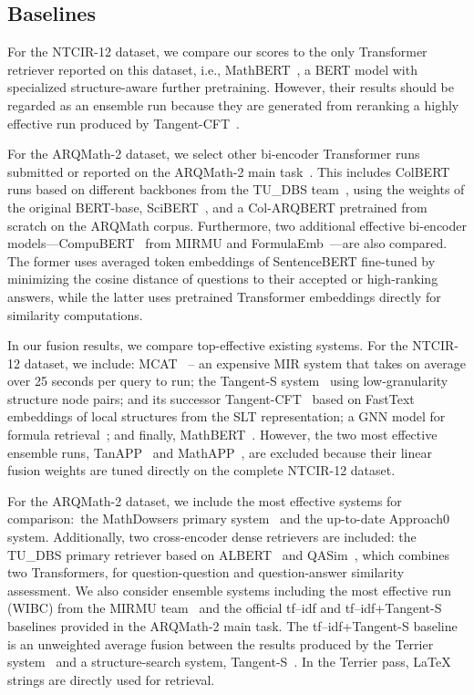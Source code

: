 \documentclass[11pt]{article}
\begin{document}
\subsection{Baselines}

For the NTCIR-12 dataset, we compare our scores to the only Transformer retriever reported on this dataset, i.e., MathBERT~\cite{peng2021mathbert}, a BERT model with specialized structure-aware further pretraining.
However, their results should be regarded as an ensemble run because they are generated from reranking a highly effective run produced by Tangent-CFT~\cite{mansouri2019tangentcft}.

For the ARQMath-2 dataset, we select other bi-encoder Transformer runs submitted or reported on the ARQMath-2 main task~\cite{mansouri2021arqmath2review}.
This includes ColBERT runs based on different backbones from the TU\_DBS team~\cite{reusch2021tu_dbs}, using the weights of the original BERT-base, SciBERT~\cite{beltagy2019scibert}, and a Col-ARQBERT pretrained from scratch on the ARQMath corpus.
Furthermore, two additional effective bi-encoder models---CompuBERT~\cite{novotny2021ensembling} from MIRMU and FormulaEmb~\cite{indian2021bert}---are also compared.
The former uses averaged token embeddings of SentenceBERT fine-tuned by minimizing the cosine distance of questions to their accepted or high-ranking answers,
while the latter uses pretrained Transformer embeddings directly for similarity computations.

In our fusion results, we compare top-effective existing systems.
For the NTCIR-12 dataset, we include:
MCAT~\cite{kristianto2016mcat} -- an expensive MIR system that takes on average over 25 seconds per query to run;
the Tangent-S system~\cite{davila2017layout} using low-granularity structure node pairs;
and its successor Tangent-CFT~\cite{mansouri2019tangentcft} based on FastText embeddings of local structures from the SLT representation;
a GNN model for formula retrieval~\cite{song2021GNN};
and finally, MathBERT~\cite{peng2021mathbert}.
However, the two most effective ensemble runs, TanAPP~\cite{mansouri2019tangentcft} and MathAPP~\cite{peng2021mathbert}, are excluded because their linear fusion weights are tuned directly on the complete NTCIR-12 dataset. 


For the ARQMath-2 dataset, we include the most effective systems for comparison:\ the MathDowsers primary system~\cite{fraser2018tangentL,ng2020dowsing,ng2021dowsing,ng2021thesis} and the up-to-date Approach0 system.
Additionally, two cross-encoder dense retrievers are included: the TU\_DBS primary retriever based on ALBERT~\cite{reusch2021albert} and  QASim~\cite{mansouri2021dprl}, which combines two Transformers, for question-question and question-answer similarity assessment.
We also consider ensemble systems including the most effective run (WIBC) from the MIRMU team~\cite{novotny2021ensembling} and the official tf--idf and tf--idf+Tangent-S baselines provided in the ARQMath-2 main task.
The tf--idf+Tangent-S baseline is an unweighted average fusion between the results produced by the Terrier system~\cite{Ounis2005Terrier} and a structure-search system, Tangent-S~\cite{davila2017layout}.
In the Terrier pass, \LaTeX{} strings are directly used for retrieval.
\end{document}
